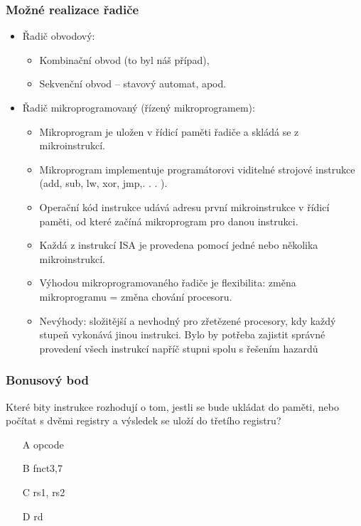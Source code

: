 \documentclass{beamer}
\begin{document}
\begin{frame}
\frametitle{Možné realizace řadiče}
\begin{itemize}
\item Řadič obvodový:
\begin{itemize}
\item Kombinační obvod (to byl náš případ),
\item Sekvenční obvod – stavový automat, apod.
\end{itemize}
\item Řadič mikroprogramovaný (řízený mikroprogramem):
\begin{itemize}
\item Mikroprogram je uložen v řídicí paměti řadiče a skládá se z mikroinstrukcí.
\item Mikroprogram implementuje programátorovi viditelné strojové instrukce (add, sub, lw, xor, jmp,. . . ).
\item Operační kód instrukce udává adresu první mikroinstrukce v řídicí paměti, od které začíná mikroprogram pro danou instrukci.
\item Každá z instrukcí ISA je provedena pomocí jedné nebo několika mikroinstrukcí.
\item Výhodou mikroprogramovaného řadiče je flexibilita: změna mikroprogramu = změna chování procesoru.
\item Nevýhody: složitější a nevhodný pro zřetězené procesory, kdy každý stupeň vykonává jinou instrukci. Bylo by potřeba zajistit správné provedení všech instrukcí napříč stupni spolu s řešením hazardů
\end{itemize}
\end{itemize}
\end{frame}

\begin{frame}
\frametitle{Bonusový bod}

Které bity instrukce rozhodují o tom, jestli se bude ukládat do paměti, nebo počítat s dvěmi registry a výsledek se uloží do třetího registru?
\begin{itemize}
\item[A] opcode
\item[B] fnct3,7
\item[C] rs1, rs2
\item[D] rd
\end{itemize}
\end{frame}
\end{document}
